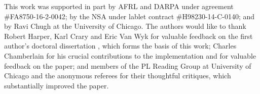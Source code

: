 \documentclass[acmsmall]{acmart}
\begin{document}
\begin{acks}                            %
   This work was
supported in part by AFRL and DARPA under agreement \#FA8750-16-2-0042;
 by the NSA under lablet contract \#H98230-14-C-0140; and by Ravi Chugh
 at the University of Chicago. The authors
would like to thank Robert Harper, Karl Crary and Eric Van Wyk for 
valuable feedback on the first author's doctoral dissertation \cite{omar-thesis}, which forms the basis of this work; 
Charles Chamberlain 
for his crucial contributions to the implementation and for valuable feedback on the
paper; and members of the PL Reading Group at University of Chicago and the anonymous referees
 for their thoughtful critiques, which substantially improved the paper.

\end{acks}

\clearpage

\end{document}
